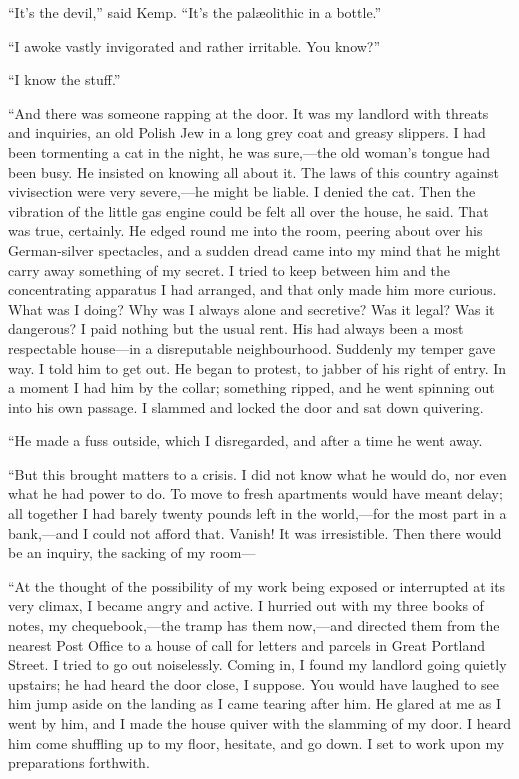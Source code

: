 “It’s the devil,” said Kemp. “It’s the palæolithic in a bottle.”

“I awoke vastly invigorated and rather irritable. You know?”

“I know the stuff.”

“And there was someone rapping at the door. It was my landlord with threats and inquiries, an old Polish Jew in a long grey coat and greasy slippers. I had been tormenting a cat in the night, he was sure,—the old woman’s tongue had been busy. He insisted on knowing all about it. The laws of this country against vivisection were very severe,—he might be liable. I denied the cat. Then the vibration of the little gas engine could be felt all over the house, he said. That was true, certainly. He edged round me into the room, peering about over his German-silver spectacles, and a sudden dread came into my mind that he might carry away something of my secret. I tried to keep between him and the concentrating apparatus I had arranged, and that only made him more curious. What was I doing? Why was I always alone and secretive? Was it legal? Was it dangerous? I paid nothing but the usual rent. His had always been a most respectable house—in a disreputable neighbourhood. Suddenly my temper gave way. I told him to get out. He began to protest, to jabber of his right of entry. In a moment I had him by the collar; something ripped, and he went spinning out into his own passage. I slammed and locked the door and sat down quivering.

“He made a fuss outside, which I disregarded, and after a time he went away.

“But this brought matters to a crisis. I did not know what he would do, nor even what he had power to do. To move to fresh apartments would have meant delay; all together I had barely twenty pounds left in the world,—for the most part in a bank,—and I could not afford that. Vanish! It was irresistible. Then there would be an inquiry, the sacking of my room—

“At the thought of the possibility of my work being exposed or interrupted at its very climax, I became angry and active. I hurried out with my three books of notes, my chequebook,—the tramp has them now,—and directed them from the nearest Post Office to a house of call for letters and parcels in Great Portland Street. I tried to go out noiselessly. Coming in, I found my landlord going quietly upstairs; he had heard the door close, I suppose. You would have laughed to see him jump aside on the landing as I came tearing after him. He glared at me as I went by him, and I made the house quiver with the slamming of my door. I heard him come shuffling up to my floor, hesitate, and go down. I set to work upon my preparations forthwith.

